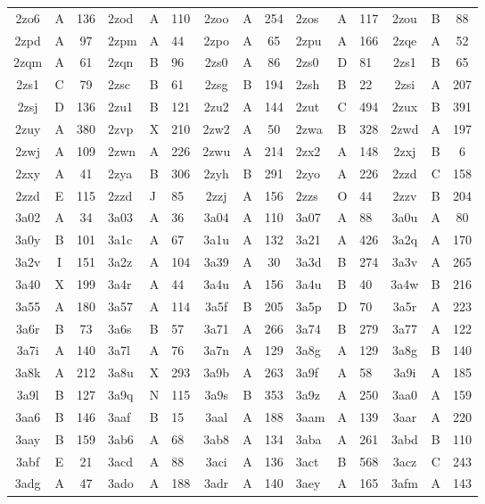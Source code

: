 \begin{longtable}{|c|c|c| a|a|a| c|c|c| a|a|a| c|c|c|}
2zo6 & A & 136 & 2zod & A & 110 & 2zoo & A & 254 & 2zos & A & 117 & 2zou & B & 88\\
2zpd & A & 97 & 2zpm & A & 44 & 2zpo & A & 65 & 2zpu & A & 166 & 2zqe & A & 52\\
2zqm & A & 61 & 2zqn & B & 96 & 2zs0 & A & 86 & 2zs0 & D & 81 & 2zs1 & B & 65\\
2zs1 & C & 79 & 2zsc & B & 61 & 2zsg & B & 194 & 2zsh & B & 22 & 2zsi & A & 207\\
2zsj & D & 136 & 2zu1 & B & 121 & 2zu2 & A & 144 & 2zut & C & 494 & 2zux & B & 391\\
2zuy & A & 380 & 2zvp & X & 210 & 2zw2 & A & 50 & 2zwa & B & 328 & 2zwd & A & 197\\
2zwj & A & 109 & 2zwn & A & 226 & 2zwu & A & 214 & 2zx2 & A & 148 & 2zxj & B & 6\\
2zxy & A & 41 & 2zya & B & 306 & 2zyh & B & 291 & 2zyo & A & 226 & 2zzd & C & 158\\
2zzd & E & 115 & 2zzd & J & 85 & 2zzj & A & 156 & 2zzs & O & 44 & 2zzv & B & 204\\
3a02 & A & 34 & 3a03 & A & 36 & 3a04 & A & 110 & 3a07 & A & 88 & 3a0u & A & 80\\
3a0y & B & 101 & 3a1c & A & 67 & 3a1u & A & 132 & 3a21 & A & 426 & 3a2q & A & 170\\
3a2v & I & 151 & 3a2z & A & 104 & 3a39 & A & 30 & 3a3d & B & 274 & 3a3v & A & 265\\
3a40 & X & 199 & 3a4r & A & 44 & 3a4u & A & 156 & 3a4u & B & 40 & 3a4w & B & 216\\
3a55 & A & 180 & 3a57 & A & 114 & 3a5f & B & 205 & 3a5p & D & 70 & 3a5r & A & 223\\
3a6r & B & 73 & 3a6s & B & 57 & 3a71 & A & 266 & 3a74 & B & 279 & 3a77 & A & 122\\
3a7i & A & 140 & 3a7l & A & 76 & 3a7n & A & 129 & 3a8g & A & 129 & 3a8g & B & 140\\
3a8k & A & 212 & 3a8u & X & 293 & 3a9b & A & 263 & 3a9f & A & 58 & 3a9i & A & 185\\
3a9l & B & 127 & 3a9q & N & 115 & 3a9s & B & 353 & 3a9z & A & 250 & 3aa0 & A & 159\\
3aa6 & B & 146 & 3aaf & B & 15 & 3aal & A & 188 & 3aam & A & 139 & 3aar & A & 220\\
3aay & B & 159 & 3ab6 & A & 68 & 3ab8 & A & 134 & 3aba & A & 261 & 3abd & B & 110\\
3abf & E & 21 & 3acd & A & 88 & 3aci & A & 136 & 3act & B & 568 & 3acz & C & 243\\
3adg & A & 47 & 3ado & A & 188 & 3adr & A & 140 & 3aey & A & 165 & 3afm & A & 143\\

\end{longtable}
